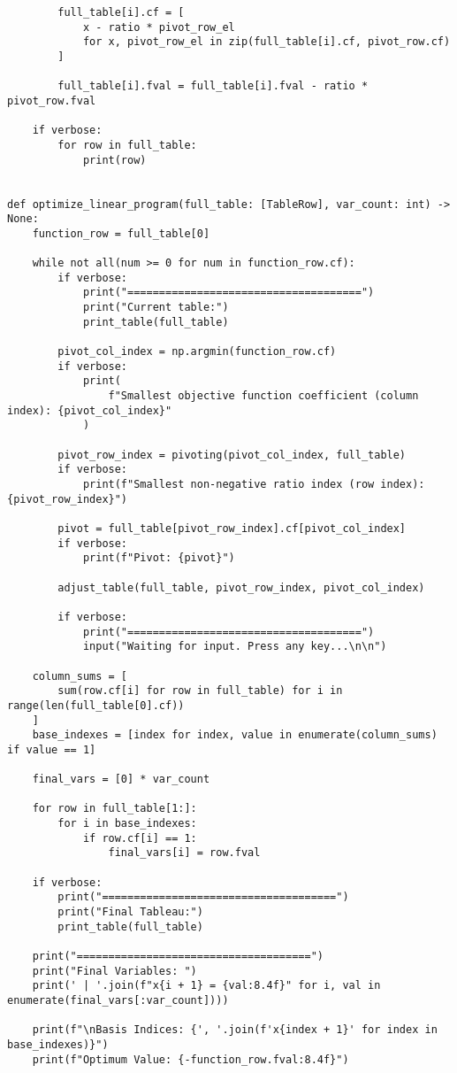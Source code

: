 \documentclass[a4paper,12pt,fleqn]{article}
\begin{document}
\begin{verbatim}
        full_table[i].cf = [
            x - ratio * pivot_row_el
            for x, pivot_row_el in zip(full_table[i].cf, pivot_row.cf)
        ]

        full_table[i].fval = full_table[i].fval - ratio * pivot_row.fval

    if verbose:
        for row in full_table:
            print(row)


def optimize_linear_program(full_table: [TableRow], var_count: int) -> None:
    function_row = full_table[0]

    while not all(num >= 0 for num in function_row.cf):
        if verbose:
            print("=====================================")
            print("Current table:")
            print_table(full_table)

        pivot_col_index = np.argmin(function_row.cf)
        if verbose:
            print(
                f"Smallest objective function coefficient (column index): {pivot_col_index}"
            )

        pivot_row_index = pivoting(pivot_col_index, full_table)
        if verbose:
            print(f"Smallest non-negative ratio index (row index): {pivot_row_index}")

        pivot = full_table[pivot_row_index].cf[pivot_col_index]
        if verbose:
            print(f"Pivot: {pivot}")

        adjust_table(full_table, pivot_row_index, pivot_col_index)

        if verbose:
            print("=====================================")
            input("Waiting for input. Press any key...\n\n")

    column_sums = [
        sum(row.cf[i] for row in full_table) for i in range(len(full_table[0].cf))
    ]
    base_indexes = [index for index, value in enumerate(column_sums) if value == 1]

    final_vars = [0] * var_count

    for row in full_table[1:]:
        for i in base_indexes:
            if row.cf[i] == 1:
                final_vars[i] = row.fval

    if verbose:
        print("=====================================")
        print("Final Tableau:")
        print_table(full_table)

    print("=====================================")
    print("Final Variables: ")
    print(' | '.join(f"x{i + 1} = {val:8.4f}" for i, val in enumerate(final_vars[:var_count])))

    print(f"\nBasis Indices: {', '.join(f'x{index + 1}' for index in base_indexes)}")
    print(f"Optimum Value: {-function_row.fval:8.4f}")


\end{verbatim}
\end{document}
